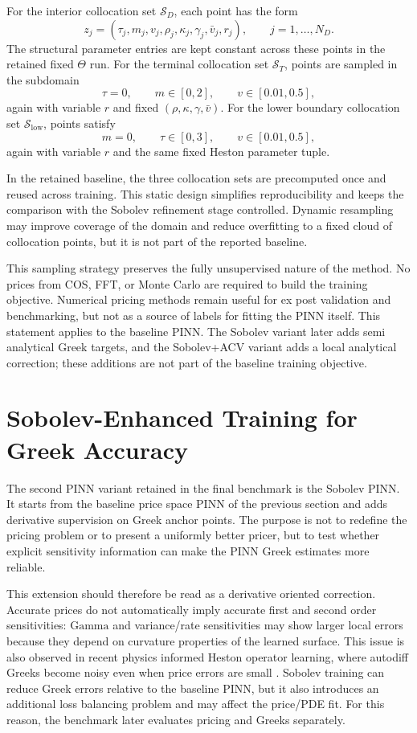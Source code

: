 For the interior collocation set $\mathcal{S}_D$, each point has the form
\[
z_j=(\tau_j,m_j,v_j,\rho_j,\kappa_j,\gamma_j,\bar v_j,r_j),
\qquad j=1,\dots,N_D.
\]
The structural parameter entries are kept constant across these points in the retained fixed \(\Theta\) run. For the terminal collocation set $\mathcal{S}_T$, points are sampled in the subdomain
\[
\tau=0,\qquad
m \in [0,2],\qquad
v \in [0.01,0.5],
\]
again with variable \(r\) and fixed \((\rho,\kappa,\gamma,\bar v)\). For the lower boundary collocation set $\mathcal{S}_{\mathrm{low}}$, points satisfy
\[
m=0,\qquad
\tau \in [0,3],\qquad
v \in [0.01,0.5],
\]
again with variable \(r\) and the same fixed Heston parameter tuple.

In the retained baseline, the three collocation sets are precomputed once and reused across training. This static design simplifies reproducibility and keeps the comparison with the Sobolev refinement stage controlled. Dynamic resampling may improve coverage of the domain and reduce overfitting to a fixed cloud of collocation points, but it is not part of the reported baseline.

This sampling strategy preserves the fully unsupervised nature of the method. No prices from COS, FFT, or Monte Carlo are required to build the training objective. Numerical pricing methods remain useful for ex post validation and benchmarking, but not as a source of labels for fitting the PINN itself.
This statement applies to the baseline PINN. The Sobolev variant later adds semi analytical Greek targets, and the Sobolev+ACV variant adds a local analytical correction; these additions are not part of the baseline training objective.

\section{Sobolev-Enhanced Training for Greek Accuracy}
\label{sec:pinn_sobolev_training}

The second PINN variant retained in the final benchmark is the Sobolev PINN. It starts from the baseline price space PINN of the previous section and adds derivative supervision on Greek anchor points. The purpose is not to redefine the pricing problem or to present a uniformly better pricer, but to test whether explicit sensitivity information can make the PINN Greek estimates more reliable.

This extension should therefore be read as a derivative oriented correction. Accurate prices do not automatically imply accurate first and second order sensitivities: \(\mathrm{Gamma}\) and variance/rate sensitivities may show larger local errors because they depend on curvature properties of the learned surface. This issue is also observed in recent physics informed Heston operator learning, where autodiff Greeks become noisy even when price errors are small \cite{malandain2025deepsvm}. Sobolev training can reduce Greek errors relative to the baseline PINN, but it also introduces an additional loss balancing problem and may affect the price/PDE fit. For this reason, the benchmark later evaluates pricing and Greeks separately.

